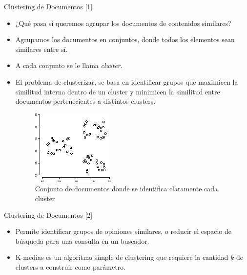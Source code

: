 \documentclass[handout]{beamer}
\begin{document}
\begin{frame}{Clustering de Documentos [1]}
\footnotesize{
\begin{itemize}
 \item ¿Qué pasa si queremos agrupar los documentos de contenidos similares?
 \item Agrupamos los documentos en conjuntos, donde todos los elementos sean similares entre sí. 
 \item A cada conjunto se le llama  \emph{cluster}. 
 \item El problema de clusterizar, se basa en identificar grupos que maximicen la similitud interna dentro de un cluster y minimicen la similitud entre documentos  pertenecientes a distintos clusters.
\begin{figure}[h!]
	\centering
	\includegraphics[scale=0.6]{pics/cluster.png}
	\caption{ Conjunto de documentos donde se identifica claramente cada cluster}
\end{figure}
 
\end{itemize}


}
 
\end{frame}

\begin{frame}{Clustering de Documentos [2]}
\footnotesize{
\begin{itemize}
 \item Permite identificar grupos de opiniones similares, o reducir el espacio de búsqueda para una consulta en un buscador. 
 \item K-medias es un algoritmo simple de clustering que requiere la cantidad $k$ de clusters a construir como parámetro.

\end{itemize}
}
\end{frame}
\end{document}
